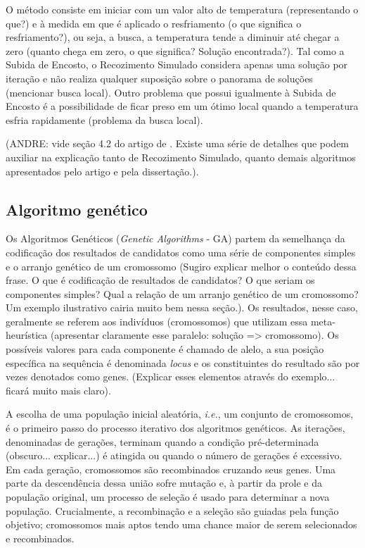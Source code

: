 O método consiste em iniciar com um valor alto de temperatura (representando o que?) e à medida em que é aplicado o resfriamento (o que significa o resfriamento?), ou seja, a busca, a temperatura tende a diminuir até chegar a zero (quanto chega em zero, o que significa? Solução encontrada?). Tal como a Subida de Encosto, o Recozimento Simulado considera apenas uma solução por iteração e não realiza qualquer suposição sobre o panorama de soluções (mencionar busca local). Outro problema que possui igualmente à Subida de Encosto é a possibilidade de ficar preso em um ótimo local quando a temperatura esfria rapidamente (problema da busca local).

(ANDRE: vide seção 4.2 do artigo de \cite{youssef2001167}. Existe uma série de detalhes que podem auxiliar na explicação tanto de Recozimento Simulado, quanto demais algoritmos apresentados pelo artigo e pela dissertação.).


\subsection{Algoritmo genético}

Os Algoritmos Genéticos (\textit{Genetic Algorithms} - GA) partem da semelhança da codificação dos resultados de candidatos como uma série de componentes simples e o arranjo genético de um cromossomo \cite{alander1998genetic} (Sugiro explicar melhor o conteúdo dessa frase. O que é codificação de resultados de candidatos? O que seriam os componentes simples? Qual a relação de um arranjo genético de um cromossomo? Um exemplo ilustrativo cairia muito bem nessa seção.). Os resultados, nesse caso, geralmente se referem aos indivíduos (cromossomos) que utilizam essa meta-heurística (apresentar claramente esse paralelo: solução => cromossomo). Os possíveis valores para cada componente é chamado de alelo, a sua posição específica na sequência é denominada \textit{locus} e os constituintes do resultado são por vezes denotados como genes. (Explicar esses elementos através do exemplo... ficará muito mais claro).

A escolha de uma população inicial aleatória, \textit{i.e.}, um conjunto de cromossomos, é o primeiro passo do processo iterativo dos algoritmos genéticos.  As iterações, denominadas de gerações, terminam quando a condição pré-determinada (obscuro... explicar...) é atingida ou quando o número de gerações é excessivo. Em cada geração, cromossomos são recombinados cruzando seus genes. Uma parte da descendência dessa união sofre mutação e, à partir da prole e da população original, um processo de seleção é usado para determinar a nova população.  Crucialmente, a recombinação e a seleção são guiadas pela função objetivo; cromossomos mais aptos tendo uma chance maior de serem selecionados e recombinados.

